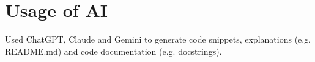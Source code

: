 \chapter{Usage of AI}

Used ChatGPT, Claude and Gemini to generate code snippets, explanations (e.g. README.md) and code documentation (e.g. docstrings).
